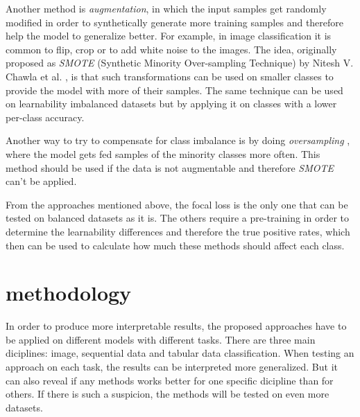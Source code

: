 \documentclass[journal]{IEEEtran}
\begin{document}
Another method is \emph{augmentation}, in which the input samples get randomly modified in order to synthetically generate more training samples and therefore help the model to generalize better. 
For example, in image classification it is common to flip, crop or to add white noise to the images. 
The idea, originally proposed as \emph{SMOTE} (Synthetic Minority Over-sampling Technique) by Nitesh V. Chawla et al. \cite{chawla2002smote}, is that such transformations can be used on smaller classes to provide the model with more of their samples.
The same technique can be used on learnability imbalanced datasets but by applying it on classes with a lower per-class accuracy.


Another way to try to compensate for class imbalance is by doing \emph{oversampling} \cite{chawla2002smote}, where the model gets fed samples of the minority classes more often.
This method should be used if the data is not augmentable and therefore \emph{SMOTE} can't be applied.


From the approaches mentioned above, the focal loss is the only one that can be tested on balanced datasets as it is. 
The others require a pre-training in order to determine the learnability differences and therefore the true positive rates, which then can be used to calculate how much these methods should affect each class.

\section{methodology}
In order to produce more interpretable results, the proposed approaches have to be applied on different models with different tasks. 
There are three main diciplines: image, sequential data and tabular data classification. 
When testing an approach on each task, the results can be interpreted more generalized. 
But it can also reveal if any methods works better for one specific dicipline than for others. 
If there is such a suspicion, the methods will be tested on even more datasets.
\end{document}
